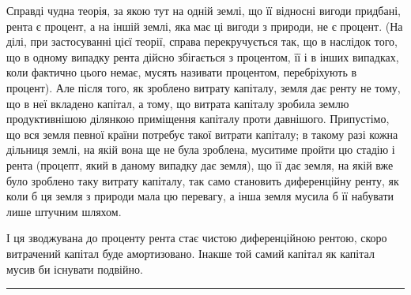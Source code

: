 Справді чудна теорія, за якою тут на одній землі, що її відносні вигоди
придбані, рента є процент, а на іншій землі, яка має ці вигоди з природи, не
є процент. (На ділі, при застосуванні цієї теорії, справа перекручується так, що в
наслідок того, що в одному випадку рента дійсно збігається з процентом, її і в інших
випадках, коли фактично цього немає, мусять називати процентом, перебріхують
в процент). Але після того, як зроблено витрату капіталу, земля дає ренту не тому,
що в неї вкладено капітал, а тому, що витрата капіталу зробила землю продуктивнішою
ділянкою приміщення капіталу проти давнішого. Припустімо,
що вся земля певної країни потребує такої витрати капіталу; в такому разі
кожна дільниця землі, на якій вона ще не була зроблена, муситиме пройти цю
стадію і рента (процепт, який в даному випадку дає земля), що її дає земля, на
якій вже було зроблено таку витрату капіталу, так само становить диференційну
ренту, як коли б ця земля з природи мала цю перевагу, а інша земля
мусила б її набувати лише штучним шляхом.

І ця зводжувана до проценту рента стає чистою диференційною рентою,
скоро витрачений капітал буде амортизовано. Інакше той самий капітал як
капітал мусив би існувати подвійно.

\pfbreak
